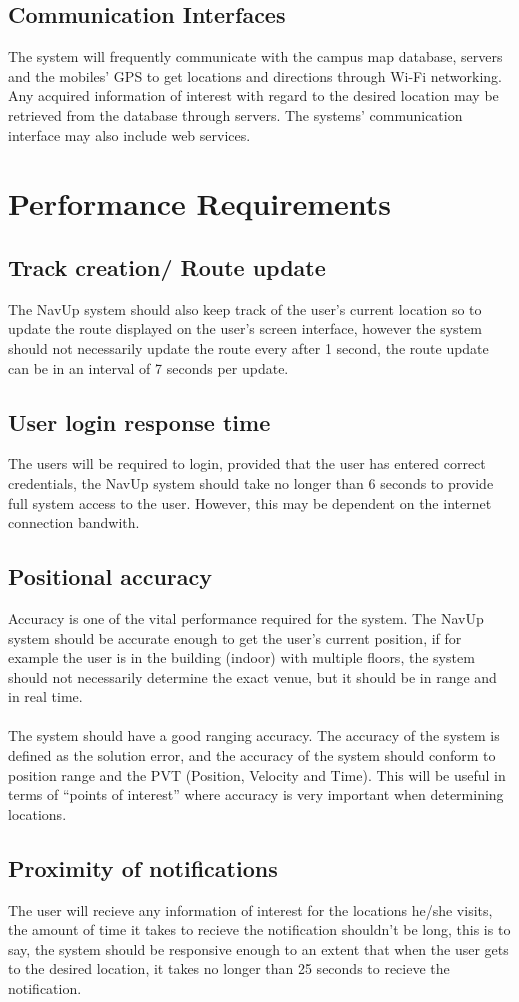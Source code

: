\documentclass[a4paper, 12pt]{article}
\begin{document}
	\subsection{Communication Interfaces}
The system will frequently communicate with the campus map database, servers and the mobiles’ GPS to get locations and directions through Wi-Fi networking. Any acquired information of interest with regard to the desired location may be retrieved from the database through servers. The systems’ communication interface may also include web services.

\section{Performance Requirements}
	\subsection{Track creation/ Route update}
	The NavUp system should also keep track of the user's current location
	so to update the route displayed on the user's screen interface, however 
	the system should not necessarily update the route every after 1 second, the 
	route update can be in an interval of 7 seconds per update.
	\subsection{User login response time}
	The users will be required to login, provided that the user has
	entered correct credentials, the NavUp system should take no longer
	than 6 seconds to provide full system access to the user. However, this
	may be dependent on the internet connection bandwith.
	\subsection{Positional accuracy}
	Accuracy is one of the vital performance required for the system. The NavUp 
	system should be accurate enough to get the user’s current position, if for 
	example the user is in the building (indoor) with multiple floors, the system 
	should not necessarily determine the exact venue, but it should be in range and 
	in real time.\\\\ The system should have a good ranging accuracy. The accuracy of the 
	system is defined as the solution error, and the accuracy of the system should conform 
	to position range and the PVT (Position, Velocity and Time). This will be useful in 
	terms of “points of interest” where accuracy is very important when determining locations.
	\subsection{Proximity of notifications}
	The user will recieve any information of interest for the locations he/she visits, the amount
	of time it takes to recieve the notification shouldn't be long, this is to say, the system should 
	be responsive enough to an extent that when the user gets to the desired location, it takes no longer 
	than 25 seconds to recieve the notification.
\end{document}
